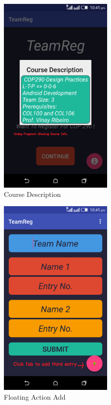 \documentclass[12pt]{article}
\begin{document}
\begin{center}
\begin{figure}[!ht]
	\centering
	\includegraphics[width=0.5\textwidth]{3.png}
	\caption{Course Description}
\end{figure}

\begin{figure}[!ht]
	\centering
	\includegraphics[width=0.5\textwidth]{4.png}
	\caption{Floating Action Add}
\end{figure}


\end{center}
\end{document}
